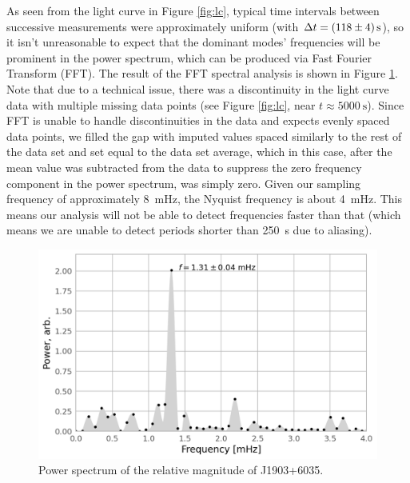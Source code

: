 \documentclass{aastex631}
\begin{document}
As seen from the light curve in Figure \ref{fig:lc}, typical time
intervals between successive measurements were approximately uniform
(with $\Delta t=\SI{118\pm4}{\second}$), so it isn't unreasonable to
expect that the dominant modes' frequencies will be prominent in the
power spectrum, which can be produced via Fast Fourier Transform
(FFT). The result of the FFT spectral analysis is shown in Figure
\ref{fig:ps}. Note that due to a technical issue, there was a
discontinuity in the light curve data with multiple missing data
points (see Figure \ref{fig:lc}, near
$t\approx\SI{5000}{\second}$). Since FFT is unable to handle
discontinuities in the data and expects evenly spaced data points, we
filled the gap with imputed values spaced similarly to the rest of the
data set and set equal to the data set average, which in this case,
after the mean value was subtracted from the data to suppress the zero
frequency component in the power spectrum, was simply zero. Given our
sampling frequency of approximately \SI{8}{\milli\hertz}, the Nyquist
frequency is about \SI{4}{\milli\hertz}. This means our analysis will
not be able to detect frequencies faster than that (which means we are
unable to detect periods shorter than \SI{250}{\second} due to
aliasing).

\begin{figure}[htbp]
\centering
\includegraphics[width=.9\linewidth]{./img/power.png}
\caption{\label{fig:ps}Power spectrum of the relative magnitude of J1903+6035.}
\end{figure}
\end{document}
